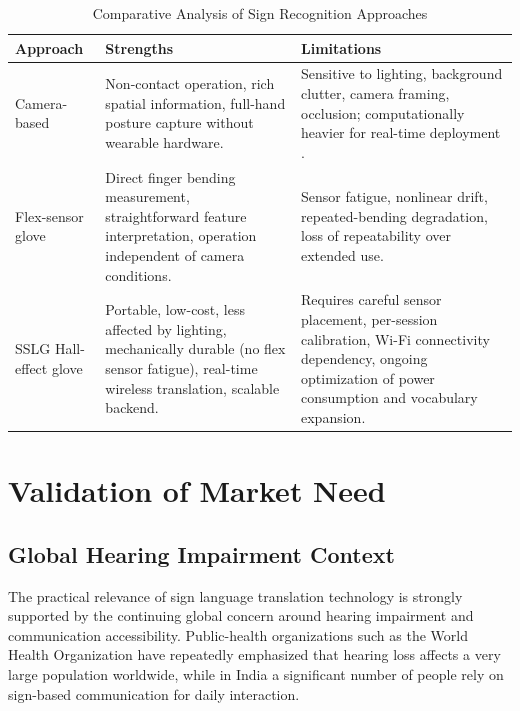 \documentclass[12pt,a4paper]{report}
\begin{document}
\begin{table}[H]
  \centering
  \caption{Comparative Analysis of Sign Recognition Approaches}
  \label{tab:comparative_analysis}
  \begin{tabular}{>{\raggedright\arraybackslash}p{} >{\raggedright\arraybackslash}p{} >{\raggedright\arraybackslash}p{}}
    \toprule
    \textbf{Approach} & \textbf{Strengths} & \textbf{Limitations} \\
    \midrule
    Camera-based & Non-contact operation, rich spatial information, full-hand posture capture without wearable hardware. & Sensitive to lighting, background clutter, camera framing, occlusion; computationally heavier for real-time deployment \cite{mitra}. \\
    \midrule
    Flex-sensor glove & Direct finger bending measurement, straightforward feature interpretation, operation independent of camera conditions. & Sensor fatigue, nonlinear drift, repeated-bending degradation, loss of repeatability over extended use. \\
    \midrule
    SSLG Hall-effect glove & Portable, low-cost, less affected by lighting, mechanically durable (no flex sensor fatigue), real-time wireless translation, scalable backend. & Requires careful sensor placement, per-session calibration, Wi-Fi connectivity dependency, ongoing optimization of power consumption and vocabulary expansion. \\
    \bottomrule
  \end{tabular}
\end{table}

\section{Validation of Market Need}
\label{sec:results_market}

\subsection{Global Hearing Impairment Context}
The practical relevance of sign language translation technology is strongly supported by the continuing global concern around hearing impairment and communication accessibility. Public-health organizations such as the World Health Organization have repeatedly emphasized that hearing loss affects a very large population worldwide, while in India a significant number of people rely on sign-based communication for daily interaction.
\end{document}
